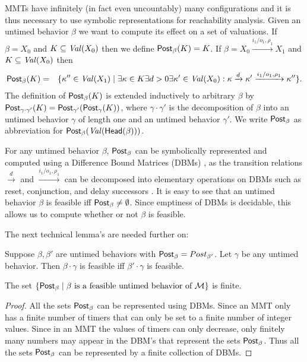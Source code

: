 MMTs have infinitely (in fact even uncountably) many configurations and it is thus necessary to use symbolic representations
for reachability analysis. Given an untimed behavior $\beta$ we want to compute its effect on a set of valuations. 
If $\beta =X_0$ and $K \subseteq\mathit{Val}({X_0})$ then we define $\mathsf{Post}_{\beta}(K) = K$.
If $\beta = X_0 \xrightarrow{i_1/o_1, \rho_1} X_1$ and
$K \subseteq\mathit{Val}({X_0})$ then
\begin{eqnarray*}
\mathsf{Post}_{\beta}(K) & = & \{ \kappa'' \in\mathit{Val}({X_1}) \mid \exists \kappa \in K \exists d >0 \exists \kappa' \in\mathit{Val}({X_0}) :
 \kappa \xrightarrow{d} \kappa' \xrightarrow{i_1/o_1, \rho_1} \kappa'' \}.
\end{eqnarray*}
The definition of $\mathsf{Post}_{\beta}(K)$ is extended inductively to arbitrary $\beta$ by 
$\mathsf{Post}_{\gamma \cdot \gamma'}(K) = \mathsf{Post}_{\gamma'} (\mathsf{Post}_{\gamma}(K))$, where $\gamma \cdot \gamma'$ is the decomposition of
$\beta$ into an untimed behavior $\gamma$ of length one and an untimed behavior $\gamma'$.
We write $\mathsf{Post}_{\beta}$ as abbreviation for $\mathsf{Post}_{\beta}(\mathit{Val}({\mathsf{Head}({\beta})}))$.

For any untimed behavior $\beta$, $\mathsf{Post}_{\beta}$ can be symbolically represented and computed using a Difference Bound Matrices (DBMs)
 \cite{Di89},  as the transition relations $\xrightarrow{d}$ and $\xrightarrow{i_1/o_1, \rho_1}$ can be decomposed 
into elementary operations on DBMs such as reset, conjunction, and delay successors \cite{BengtssonY03}.
%
It is easy to see that an untimed behavior $\beta$ is feasible iff $\mathsf{Post}_{\beta} \neq \emptyset$.
Since emptiness of DBMs is decidable, this allows us to compute whether or not $\beta$ is feasible.

The next technical lemma's are needed further on:

\begin{lemma}
\label{lemma: feasibility concatenation}
Suppose $\beta, \beta'$ are untimed behaviors with
$\mathsf{Post}_{\beta} = Post_{\beta'}$. Let $\gamma$ be any untimed behavior.
Then $\beta \cdot \gamma$ is feasible iff $\beta' \cdot \gamma$ is feasible.
\end{lemma}

\begin{lemma}
\label{lemma finitely many zones}
The set
$\{ \mathsf{Post}_{\beta} \mid \beta \mbox{ is a feasible untimed behavior of } {\cal M} \}$ is finite.
\end{lemma}

\begin{proof}
All the sets $\mathsf{Post}_{\beta}$ can be represented using DBMs. Since an MMT only has a finite number of timers that can only be set to a finite number of integer values. Since in an MMT the values of timers can only decrease, only finitely many numbers may
appear in the DBM's that represent the sets $\mathsf{Post}_{\beta}$. Thus all the sets $\mathsf{Post}_{\beta}$ can be represented by a finite
collection of DBMs.
\end{proof}

